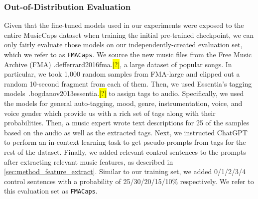 \documentclass[11pt]{article}
\let\realcite\cite
\renewcommand{\cite}[1]{\ifx.#1.\hl{[?]}\else\realcite{#1}\fi}
\newcommand{\datasetFMA}{\texttt{FMACaps}}
\begin{document}
\subsubsection{Out-of-Distribution Evaluation}
Given that the fine-tuned models used in our experiments were exposed to the entire MusicCaps dataset when training the initial pre-trained checkpoint, we can only fairly evaluate those models on our independently-created evaluation set, which we refer to as \datasetFMA{}. We source the new music files from the Free Music Archive (FMA) \cite{defferrard2016fma}, a large dataset of popular songs. In particular, we took 1,000 random samples from FMA-large and clipped out a random 10-second fragment from each of them. Then, we used Essentia's tagging models~\cite{bogdanov2013essentia} to assign tags to audio. Specifically, we used the models for general auto-tagging, mood, genre, instrumentation, voice, and voice gender which provide us with a rich set of tags along with their probabilities. Then, a music expert wrote text descriptions for 25 of the samples based on the audio as well as the extracted tags. Next, we instructed ChatGPT to perform an in-context learning task to get pseudo-prompts from tags for the rest of the dataset. Finally, we added relevant control sentences to the prompts after extracting relevant music features, as described in \cref{sec:method_feature_extract}. Similar to our training set, we added 0/1/2/3/4 control sentences with a probability of 25/30/20/15/10\% respectively. We refer to this evaluation set as \datasetFMA{}.
\end{document}
